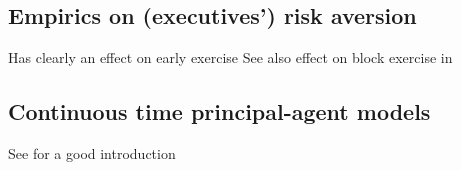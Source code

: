  



\subsection{Empirics on (executives') risk aversion} %

    Has clearly an effect on early exercise \cite{izhakian2017risk} \cite{murphy2019employees}
    See also effect on block exercise in \cite{grasselli2009risk}





\subsection{Continuous time principal-agent models} %
    See \cite{cvitanic2013dynamics} for a good introduction




